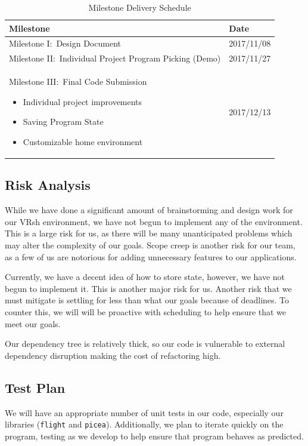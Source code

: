 \documentclass[titlepage,12pt]{article}
\newcommand\name{VRsh}
\begin{document}
\begin{table}[H]
    \caption{Milestone Delivery Schedule}\label{tab:milestones}
    \centering
    \begin{tabular}{|p{12cm}|l|}
        \hline
        \textbf{Milestone} & \textbf{Date} \\
        \hline\hline
        Milestone I:\ Design Document & 2017/11/08 \\
        \hline
        Milestone II:\ Individual Project Program Picking (Demo) & 2017/11/27 \\
        \hline
        Milestone III:\ Final Code Submission
        \begin{itemize}
            \item Individual project improvements
            \item Saving Program State
            \item Customizable home environment
        \end{itemize} & 2017/12/13\\
        \hline
    \end{tabular}
\end{table}

\subsection{Risk Analysis}
While we have done a significant amount of brainstorming and design work for our
{\name} environment, we have not begun to implement any of the environment.
This is a large risk for us, as there will be many unanticipated problems which
may alter the complexity of our goals. Scope creep is another risk for our team,
as a few of us are notorious for adding unnecessary features to our
applications.

Currently, we have a decent idea of how to store state, however, we have not
begun to implement it. This is another major risk for us. Another risk that we
must mitigate is settling for less than what our goals because of deadlines. To
counter this, we will will be proactive with scheduling to help ensure that we
meet our goals.

Our dependency tree is relatively thick, so our code is vulnerable to external
dependency disruption making the cost of refactoring high.

\subsection{Test Plan}
We will have an appropriate number of unit tests in our code, especially our
libraries (\texttt{flight} and \texttt{picea}). Additionally, we plan to iterate
quickly on the program, testing as we develop to help ensure that program
behaves as predicted.
\end{document}

